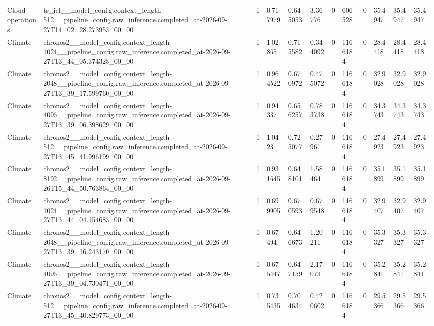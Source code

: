 \begin{tabular}{llllllllllll}
Cloud operations & ts\_icl\_\_model\_config.context\_length-512\_\_pipeline\_config.raw\_inference.completed\_at-2026-09-27T14\_02\_28.273953\_00\_00 & 1 & 0.717979 & 0.645053 & 3.36776 & 0 & 606528 & 0 & 35.4947 & 35.4947 & 35.4947 \\
Climate & chronos2\_\_model\_config.context\_length-1024\_\_pipeline\_config.raw\_inference.completed\_at-2026-09-27T13\_44\_05.374328\_00\_00 & 1 & 1.02865 & 0.715582 & 0.344092 & 0 & 1166184 & 0 & 28.4418 & 28.4418 & 28.4418 \\
Climate & chronos2\_\_model\_config.context\_length-2048\_\_pipeline\_config.raw\_inference.completed\_at-2026-09-27T13\_39\_17.599760\_00\_00 & 1 & 0.964522 & 0.670972 & 0.475072 & 0 & 1166184 & 0 & 32.9028 & 32.9028 & 32.9028 \\
Climate & chronos2\_\_model\_config.context\_length-4096\_\_pipeline\_config.raw\_inference.completed\_at-2026-09-27T13\_39\_06.398629\_00\_00 & 1 & 0.94337 & 0.656257 & 0.783738 & 0 & 1166184 & 0 & 34.3743 & 34.3743 & 34.3743 \\
Climate & chronos2\_\_model\_config.context\_length-512\_\_pipeline\_config.raw\_inference.completed\_at-2026-09-27T13\_45\_41.996199\_00\_00 & 1 & 1.0423 & 0.725077 & 0.27961 & 0 & 1166184 & 0 & 27.4923 & 27.4923 & 27.4923 \\
Climate & chronos2\_\_model\_config.context\_length-8192\_\_pipeline\_config.raw\_inference.completed\_at-2026-09-26T15\_44\_50.763864\_00\_00 & 1 & 0.931645 & 0.648101 & 1.58464 & 0 & 1166184 & 0 & 35.1899 & 35.1899 & 35.1899 \\
Climate & chronos2\_\_model\_config.context\_length-1024\_\_pipeline\_config.raw\_inference.completed\_at-2026-09-27T13\_44\_04.154683\_00\_00 & 1 & 0.699905 & 0.670593 & 0.679548 & 0 & 1166184 & 0 & 32.9407 & 32.9407 & 32.9407 \\
Climate & chronos2\_\_model\_config.context\_length-2048\_\_pipeline\_config.raw\_inference.completed\_at-2026-09-27T13\_39\_16.243170\_00\_00 & 1 & 0.67494 & 0.646673 & 1.20211 & 0 & 1166184 & 0 & 35.3327 & 35.3327 & 35.3327 \\
Climate & chronos2\_\_model\_config.context\_length-4096\_\_pipeline\_config.raw\_inference.completed\_at-2026-09-27T13\_39\_04.730471\_00\_00 & 1 & 0.675447 & 0.647159 & 2.17073 & 0 & 1166184 & 0 & 35.2841 & 35.2841 & 35.2841 \\
Climate & chronos2\_\_model\_config.context\_length-512\_\_pipeline\_config.raw\_inference.completed\_at-2026-09-27T13\_45\_40.829773\_00\_00 & 1 & 0.735435 & 0.704634 & 0.420602 & 0 & 1166184 & 0 & 29.5366 & 29.5366 & 29.5366 \\

\end{tabular}
